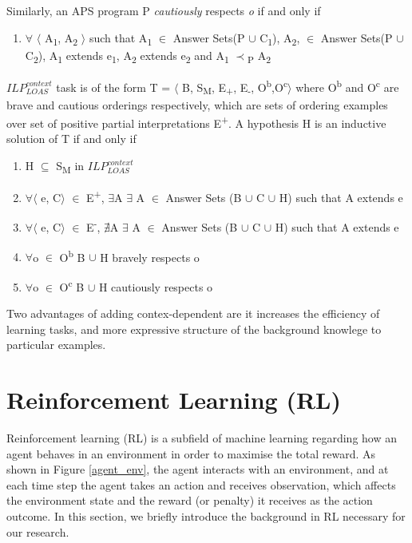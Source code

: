 \documentclass[12pt,twoside]{report}
\begin{document}
 Similarly, an APS program P \textit{cautiously} respects \textit{o} if and only if
\begin{enumerate}
 \item $\forall$ $\langle$ A\textsubscript{1}, A\textsubscript{2} $\rangle$ such that A\textsubscript{1} $\in$ Answer Sets(P $\cup$ C\textsubscript{1}),  A\textsubscript{2}, $\in$ Answer Sets(P $\cup$ C\textsubscript{2}), A\textsubscript{1} extends e\textsubscript{1}, A\textsubscript{2} extends e\textsubscript{2} and A\textsubscript{1} $\prec$\textsubscript{P} A\textsubscript{2}
\end{enumerate}

$ILP_{LOAS}^{context}$ task is of the form T = $\langle$ B, S\textsubscript{M}, E\textsubscript{+}, E\textsubscript{-}, O\textsuperscript{b},O\textsuperscript{c}$\rangle$ where O\textsuperscript{b} and O\textsuperscript{c} are brave and cautious orderings respectively, which are sets of ordering examples over set of positive partial interpretations E\textsuperscript{+}.
A hypothesis H is an inductive solution of T if and only if
\begin{enumerate}
\item H $\subseteq$ S\textsubscript{M} in $ILP_{LOAS}^{context}$
\item $\forall$$\langle$ e, C$\rangle$ $\in$ E\textsuperscript{+}, $\exists$A $\exists$ A $\in$ Answer Sets (B $\cup$ C $\cup$ H) such that A extends e
\item $\forall$$\langle$ e, C$\rangle$ $\in$ E\textsuperscript{-}, $\nexists$A $\exists$ A $\in$ Answer Sets (B $\cup$ C $\cup$ H) such that A extends e
\item $\forall$o $\in$ O\textsuperscript{b} B $\cup$ H bravely respects o
\item $\forall$o $\in$ O\textsuperscript{c} B $\cup$ H cautiously respects o
\end{enumerate}

Two advantages of adding contex-dependent are it increases the efficiency of learning tasks, and more expressive structure of the background knowlege to particular examples.

\section{Reinforcement Learning (RL)}
\label{rl}
Reinforcement learning (RL) is a subfield of machine learning regarding how an agent behaves in an environment in order to maximise the total reward. As shown in Figure \ref{agent_env}, the agent interacts with an environment, and at each time step the agent takes an action and receives observation, which affects the environment state and the reward (or penalty) it receives as the action outcome. In this section, we briefly introduce the background in RL necessary for our research.
\end{document}
